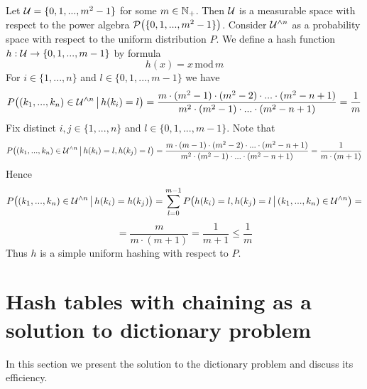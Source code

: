 \begin{example}\label{example:interval_of_integers_with_modulo_hash_function_as_an_example_of_suh}
Let ${\mathcal U} = \{0,1,...,m^2-1\}$ for some $m\in {\mathbb N}_+$. Then ${\mathcal U}$ is a measurable space with respect to the power algebra ${\mathcal P}\big(\{0,1,...,m^2-1\}\big)$. Consider ${\mathcal U}^{\wedge n}$ as a probability space with respect to the uniform distribution $P$. We define a hash function $h:{\mathcal U} \rightarrow \{0,1,...,m-1\}$ by formula
$$h(x) = x\,\mathrm{mod}\,m$$
For $i\in \{1,...,n\}$ and $l\in \{0,1,...,m-1\}$ we have
$$P\big((k_1,...,k_n)\in {\mathcal U}^{\wedge n}\,\big|\,h(k_i) = l\big) = \frac{m\cdot (m^2 - 1)\cdot (m^2 - 2)\cdot ...\cdot (m^2 - n + 1)}{m^2\cdot (m^2 - 1)\cdot ...\cdot (m^2 - n + 1)} = \frac{1}{m}$$
Fix distinct $i, j \in \{1,...,n\}$ and $l\in \{0,1,...,m-1\}$. Note that
$$P\big((k_1,...,k_n)\in {\mathcal U}^{\wedge n}\,\big|\,h(k_i) = l,h(k_j) = l\big) = \frac{m\cdot (m-1)\cdot (m^2 - 2) \cdot ...\cdot (m^2 - n + 1)}{m^2\cdot (m^2 - 1)\cdot ...\cdot (m^2 - n + 1)} = \frac{1}{m\cdot (m+1)}$$
Hence
$$P\big((k_1,...,k_n)\in {\mathcal U}^{\wedge n}\,\big|\,h(k_i) = h(k_j)\big) = \sum_{l=0}^{m-1}P\big(h(k_i) = l,h(k_j) = l\,\big|\,(k_1,...,k_n)\in {\mathcal U}^{\wedge n}\big) =$$
$$= \frac{m}{m\cdot (m + 1)} = \frac{1}{m+1}\leq \frac{1}{m}$$
Thus $h$ is a simple uniform hashing with respect to $P$.
\end{example}

\section{Hash tables with chaining as a solution to dictionary problem}
\noindent
In this section we present the solution to the dictionary problem and discuss its efficiency.

